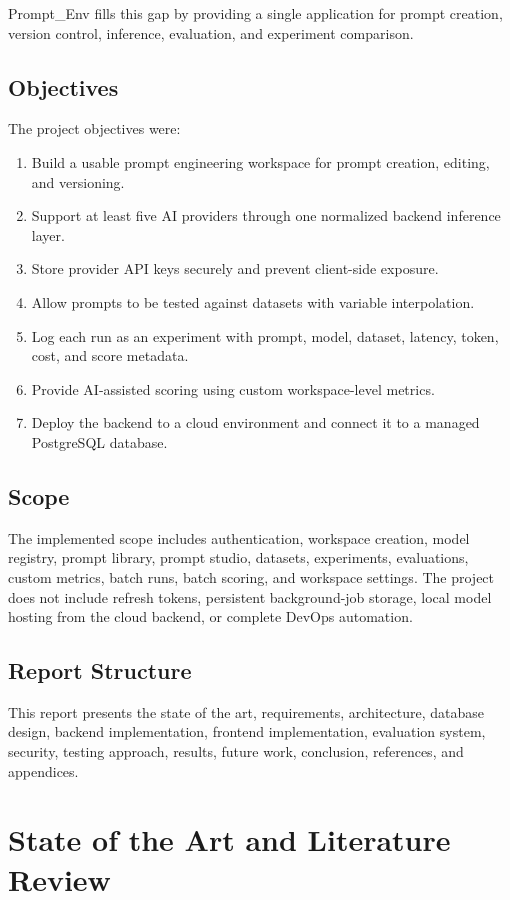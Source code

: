 \documentclass[12pt,a4paper]{report}
\newcommand{\ProjectName}{Prompt\_Env}
\begin{document}
\ProjectName{} fills this gap by providing a single application for prompt creation, version control, inference, evaluation, and experiment comparison.

\section{Objectives}
The project objectives were:
\begin{enumerate}
  \item Build a usable prompt engineering workspace for prompt creation, editing, and versioning.
  \item Support at least five AI providers through one normalized backend inference layer.
  \item Store provider API keys securely and prevent client-side exposure.
  \item Allow prompts to be tested against datasets with variable interpolation.
  \item Log each run as an experiment with prompt, model, dataset, latency, token, cost, and score metadata.
  \item Provide AI-assisted scoring using custom workspace-level metrics.
  \item Deploy the backend to a cloud environment and connect it to a managed PostgreSQL database.
\end{enumerate}

\section{Scope}
The implemented scope includes authentication, workspace creation, model registry, prompt library, prompt studio, datasets, experiments, evaluations, custom metrics, batch runs, batch scoring, and workspace settings. The project does not include refresh tokens, persistent background-job storage, local model hosting from the cloud backend, or complete DevOps automation.

\section{Report Structure}
This report presents the state of the art, requirements, architecture, database design, backend implementation, frontend implementation, evaluation system, security, testing approach, results, future work, conclusion, references, and appendices.

\chapter{State of the Art and Literature Review}
\end{document}
